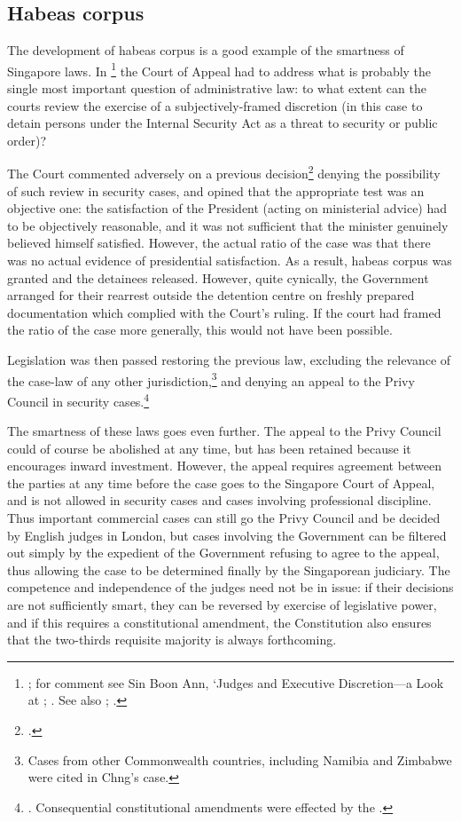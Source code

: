 \subsection{Habeas corpus}
The development of habeas corpus is a good example of the
smartness of Singapore laws.  In \footnote{%
  ; for comment see Sin Boon
  Ann, `Judges and Executive Discretion---a Look at
  ;
  . See also
  ; .}
the Court of Appeal had to address what is probably the single
most important question of administrative law: to what extent can
the courts review the exercise of a subjectively-framed
discretion (in this case to detain persons under the Internal
Security Act as a threat to security or public order)?

The Court commented adversely on a previous decision\footnote{
  .} denying the possibility of such
review in security cases, and opined that the appropriate test
was an objective one: the satisfaction of the President (acting
on ministerial advice) had to be objectively reasonable, and it
was not sufficient that the minister genuinely believed himself
satisfied. However, the actual ratio of the case was that there
was no actual evidence of presidential satisfaction. As a result,
habeas corpus was granted and the detainees released. However,
quite cynically, the Government arranged for their rearrest
outside the detention centre on freshly prepared documentation
which complied with the Court's ruling. If the court had framed
the ratio of the case more generally, this would not have been
possible.

Legislation was then passed restoring the previous law, excluding
the relevance of the case-law of any other
jurisdiction,\footnote{ Cases from other Commonwealth countries,
  including Namibia and Zimbabwe were cited in Chng's case.} and
denying an appeal to the Privy Council in security
cases.\footnote{ . Consequential
  constitutional amendments were effected by the
  .}


The smartness of these laws goes even further. The appeal to the
Privy Council could of course be abolished at any time, but has
been retained because it encourages inward investment. However,
the appeal requires agreement between the parties at any time
before the case goes to the Singapore Court of Appeal, and is not
allowed in security cases and cases involving professional
discipline. Thus important commercial cases can still go the
Privy Council and be decided by English judges in London, but
cases involving the Government can be filtered out simply by the
expedient of the Government refusing to agree to the appeal, thus
allowing the case to be determined finally by the Singaporean
judiciary. The competence and independence of the judges need not
be in issue: if their decisions are not sufficiently smart, they
can be reversed by exercise of legislative power, and if this
requires a constitutional amendment, the Constitution also
ensures that the two-thirds requisite majority is always
forthcoming.

